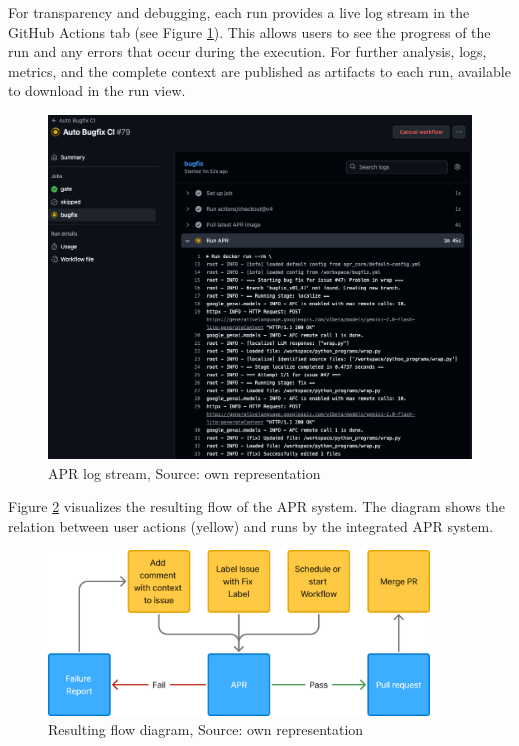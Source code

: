 
For transparency and debugging, each run provides a live log stream in the GitHub Actions tab (see Figure \ref{fig:log-stream}). This allows users to see the progress of the run and any errors that occur during the execution. For further analysis, logs, metrics, and the complete context are published as artifacts to each run, available to download in the run view.
\begin{figure}[H]
    \centering
    \includegraphics[width=1\textwidth]{images/workflow/logs.png}
    \caption{APR log stream, Source: own representation}
    \label{fig:log-stream}
\end{figure}

Figure \ref{fig:flow} visualizes the resulting flow of the APR system. The diagram shows the relation between user actions (yellow) and runs by the integrated APR system.

\begin{figure}[H]
    \centering
    \includegraphics[width=0.9\textwidth]{images/flowcharts/flowresult.png}
    \caption{Resulting flow diagram, Source: own representation}
    \label{fig:flow}
\end{figure}

